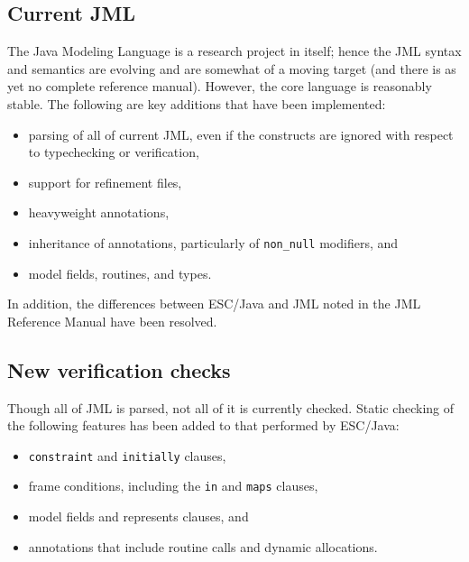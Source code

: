 \documentclass{acm_proc_article-sp}
\begin{document}
\subsection{Current JML}
The Java Modeling Language is a research project in itself; hence the
JML syntax and semantics are evolving and are somewhat of a moving
target (and there is as yet no complete reference manual).  However,
the core language is reasonably stable.  The following are key
additions that have been implemented:
\setlength{\partopsep}{0in}\setlength{\parskip}{0in}\setlength{\itemsep}{0in}\setlength{\topsep}{0in}
\begin{itemize}
\setlength{\partopsep}{0in}\setlength{\parskip}{0in}\setlength{\itemsep}{0in}\setlength{\topsep}{0in}
\item parsing of all of current JML, even if the constructs are
  ignored with respect to typechecking or verification,
\item support for refinement files,
\item heavyweight annotations,
\item inheritance of annotations, particularly of \texttt{non\_null}
  modifiers, and
\item model fields, routines, and types.
\end{itemize}
In addition, the differences between ESC/Java and JML noted in the JML
Reference Manual have been resolved.

\subsection{New verification checks}
Though all of JML is parsed, not all of it is currently checked.
Static checking of the following features has been added to that performed by
ESC/Java: 
\setlength{\partopsep}{0in}\setlength{\parskip}{0in}\setlength{\itemsep}{0in}\setlength{\topsep}{0in}
\begin{itemize}
\setlength{\partopsep}{0in}\setlength{\parskip}{0in}\setlength{\itemsep}{0in}\setlength{\topsep}{0in}
\item \texttt{constraint} and \texttt{initially} clauses,
\item frame conditions, including the \texttt{in} and \texttt{maps} clauses,
\item model fields and represents clauses, and
\item annotations that include routine calls and dynamic allocations.
\end{itemize}
\end{document}

